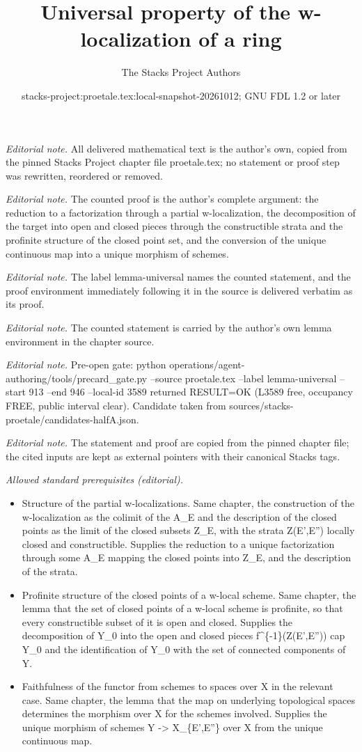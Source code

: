 \documentclass[10pt,a4paper]{amsart}
\title{Universal property of the w-localization of a ring}
\author{The Stacks Project Authors}
\date{stacks-project:proetale.tex:local-snapshot-20261012; GNU FDL 1.2 or later}
\theoremstyle{plain}
\theoremstyle{definition}
\theoremstyle{remark}
\numberwithin{equation}{subsection}
\begin{document}
\maketitle
\noindent\textit{Editorial note.} All delivered mathematical text is the author's own, copied from the pinned Stacks Project chapter file proetale.tex; no statement or proof step was rewritten, reordered or removed.\par\medskip
\noindent\textit{Editorial note.} The counted proof is the author's complete argument: the reduction to a factorization through a partial w-localization, the decomposition of the target into open and closed pieces through the constructible strata and the profinite structure of the closed point set, and the conversion of the unique continuous map into a unique morphism of schemes.\par\medskip
\noindent\textit{Editorial note.} The label lemma-universal names the counted statement, and the proof environment immediately following it in the source is delivered verbatim as its proof.\par\medskip
\noindent\textit{Editorial note.} The counted statement is carried by the author's own lemma environment in the chapter source.\par\medskip
\noindent\textit{Editorial note.} Pre-open gate: python operations/agent-authoring/tools/precard\_gate.py --source proetale.tex --label lemma-universal --start 913 --end 946 --local-id 3589 returned RESULT=OK (L3589 free, occupancy FREE, public interval clear). Candidate taken from sources/stacks-proetale/candidates-halfA.json.\par\medskip
\noindent\textit{Editorial note.} The statement and proof are copied from the pinned chapter file; the cited inputs are kept as external pointers with their canonical Stacks tags.\par\medskip
\noindent\textit{Allowed standard prerequisites (editorial).}\begin{itemize}
\item Structure of the partial w-localizations. Same chapter, the construction of the w-localization as the colimit of the A\_E and the description of the closed points as the limit of the closed subsets Z\_E, with the strata Z(E',E'') locally closed and constructible. Supplies the reduction to a unique factorization through some A\_E mapping the closed points into Z\_E, and the description of the strata.
\item Profinite structure of the closed points of a w-local scheme. Same chapter, the lemma that the set of closed points of a w-local scheme is profinite, so that every constructible subset of it is open and closed. Supplies the decomposition of Y\_0 into the open and closed pieces f\textasciicircum{}\{-1\}(Z(E',E'')) cap Y\_0 and the identification of Y\_0 with the set of connected components of Y.
\item Faithfulness of the functor from schemes to spaces over X in the relevant case. Same chapter, the lemma that the map on underlying topological spaces determines the morphism over X for the schemes involved. Supplies the unique morphism of schemes Y -> X\_\{E',E''\} over X from the unique continuous map.
\end{itemize}\medskip
\end{document}
